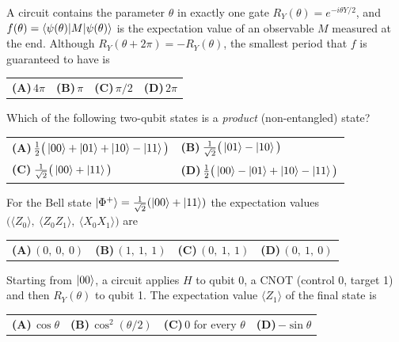 \documentclass[11pt,a4paper]{article}
\newcommand{\optlabel}[1]{\textbf{(#1)}}
\newenvironment{qitem}[1]{\begin{list}{}{\setlength{\leftmargin}{3.3em}\setlength{\labelwidth}{3.1em}%
  \setlength{\labelsep}{0.2em}\setlength{\topsep}{3pt}\setlength{\parsep}{3pt}}\item[\textbf{Q.#1}\hfill]}{\end{list}}
\newcommand{\qsep}{\par\vspace{2pt}{\color{black!15}\hrule}\vspace{4pt}}
\begin{document}
\begin{qitem}{23}
A circuit contains the parameter $\theta$ in exactly one gate $R_Y(\theta) = e^{-i\theta Y/2}$, and
$f(\theta) = \braket{\psi(\theta)|M|\psi(\theta)}$ is the expectation value of an observable $M$ measured at the end. Although
$R_Y(\theta + 2\pi) = -R_Y(\theta)$, the smallest period that $f$ is guaranteed to have is
\par\smallskip\noindent\begin{tabularx}{\linewidth}{@{}*{4}{L}@{}}
\optlabel{A}\,$4\pi$ & \optlabel{B}\,$\pi$ & \optlabel{C}\,$\pi/2$ & \optlabel{D}\,$2\pi$
\end{tabularx}
\end{qitem}
\qsep

\begin{qitem}{24}
Which of the following two-qubit states is a \emph{product} (non-entangled) state?
\par\smallskip\noindent\begin{tabularx}{\linewidth}{@{}*{2}{L}@{}}
\optlabel{A}\,$\frac12\big(\ket{00} + \ket{01} + \ket{10} - \ket{11}\big)$ & \optlabel{B}\,$\frac1{\sqrt2}\big(\ket{01} - \ket{10}\big)$ \\[3pt]
\optlabel{C}\,$\frac1{\sqrt2}\big(\ket{00} + \ket{11}\big)$ & \optlabel{D}\,$\frac12\big(\ket{00} - \ket{01} + \ket{10} - \ket{11}\big)$
\end{tabularx}
\end{qitem}
\qsep

\begin{qitem}{25}
For the Bell state $\ket{\Phi^+} = \frac{1}{\sqrt2}(\ket{00} + \ket{11})$ the expectation values
$\big(\langle Z_0\rangle,\ \langle Z_0Z_1\rangle,\ \langle X_0X_1\rangle\big)$ are
\par\smallskip\noindent\begin{tabularx}{\linewidth}{@{}*{4}{L}@{}}
\optlabel{A}\,$(0,\ 0,\ 0)$ & \optlabel{B}\,$(1,\ 1,\ 1)$ & \optlabel{C}\,$(0,\ 1,\ 1)$ & \optlabel{D}\,$(0,\ 1,\ 0)$
\end{tabularx}
\end{qitem}
\qsep

\begin{qitem}{26}
Starting from $\ket{00}$, a circuit applies $H$ to qubit 0, a CNOT (control 0, target 1) and then $R_Y(\theta)$ to
qubit 1. The expectation value $\langle Z_1\rangle$ of the final state is
\par\smallskip\noindent\begin{tabularx}{\linewidth}{@{}*{4}{L}@{}}
\optlabel{A}\,$\cos\theta$ & \optlabel{B}\,$\cos^2(\theta/2)$ & \optlabel{C}\,$0$ for every $\theta$ & \optlabel{D}\,$-\sin\theta$
\end{tabularx}
\end{qitem}
\qsep
\end{document}
